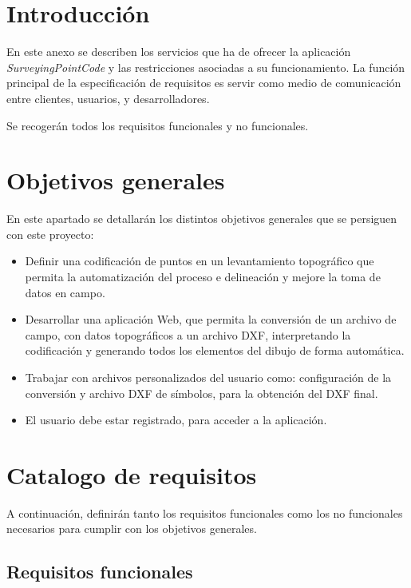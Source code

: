 
\section{Introducción}

En este anexo se describen los servicios que ha de ofrecer la aplicación \emph{SurveyingPointCode} y las restricciones asociadas a su funcionamiento. La función principal de la especificación de requisitos es servir como medio de comunicación entre clientes, usuarios, y desarrolladores.

Se recogerán todos los requisitos funcionales y no funcionales.

\section{Objetivos generales}
En este apartado se detallarán los distintos objetivos generales que se persiguen con este proyecto:

\begin{itemize}
\item Definir una codificación de puntos en un levantamiento topográfico que permita la automatización del proceso e delineación y mejore la toma de datos en campo.
\item Desarrollar una aplicación Web, que permita la conversión de un archivo de campo, con datos topográficos a un archivo DXF, interpretando la codificación y generando todos los elementos del dibujo de forma automática.
\item Trabajar con archivos personalizados del usuario como: configuración de la conversión y archivo DXF de símbolos, para la obtención del DXF final.
\item El usuario debe estar registrado, para acceder a la aplicación.
\end{itemize}

\section{Catalogo de requisitos}

A continuación,  definirán tanto los requisitos funcionales como los no
funcionales necesarios para cumplir con los objetivos generales.

\subsection{Requisitos funcionales}

